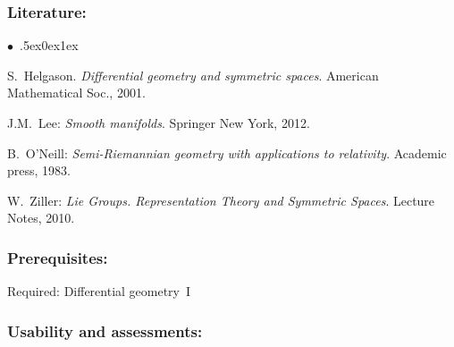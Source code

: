 \documentclass[a4paper,10pt]{article}
\renewenvironment{itemize}{\begin{list}{$\bullet$\ }{\itemsep.5ex\setlength{\topsep}{0.5\itemsep}\parsep0ex\labelsep1ex\settowidth{\labelwidth}{$\bullet$\ }\setlength{\leftmargin}{\labelwidth}\addtolength{\leftmargin}{3ex}\addtolength{\leftmargin}{\labelsep}}}{\end{list}}
\begin{document}
\subsubsection*{\large
    Literature:
}
\begin{itemize}
\item
S.~Helgason. \emph{Differential geometry and symmetric spaces}. American Mathematical Soc., 2001.
\item
J.M.~Lee: \emph{Smooth manifolds}. Springer New York, 2012.
\item
B.~O'Neill: \emph{Semi-Riemannian geometry with applications to relativity}. Academic press, 1983.
\item
W.~Ziller: \emph{Lie Groups. Representation Theory and Symmetric Spaces}. Lecture Notes, 2010.
\end{itemize}

\subsubsection*{\large
    Prerequisites:
}
Required: Differential geometry~I
\cleardoublepage
\subsubsection*{\large
    Usability and assessments:
}
\end{document}
